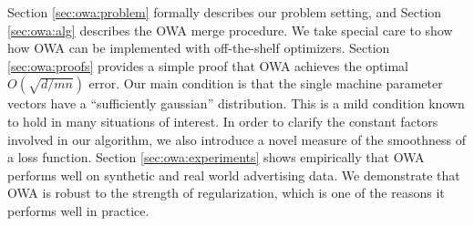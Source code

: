 \documentclass[thesis.tex]{subfiles}
\begin{document}
Section \ref{sec:owa:problem} formally describes our problem setting, and
Section \ref{sec:owa:alg} describes the OWA merge procedure.
We take special care to show how OWA can be implemented with off-the-shelf optimizers.
Section \ref{sec:owa:proofs} provides a simple proof that OWA achieves the optimal $O(\sqrt{d/mn})$ error. %
Our main condition is that the single machine parameter vectors have a ``sufficiently gaussian'' distribution.
This is a mild condition known to hold in many situations of interest.
In order to clarify the constant factors involved in our algorithm,
we also introduce a novel measure of the smoothness of a loss function.
Section \ref{sec:owa:experiments} shows empirically that OWA performs well on synthetic and real world advertising data.
We demonstrate that OWA is robust to the strength of regularization,
which is one of the reasons it performs well in practice.



\end{document}
